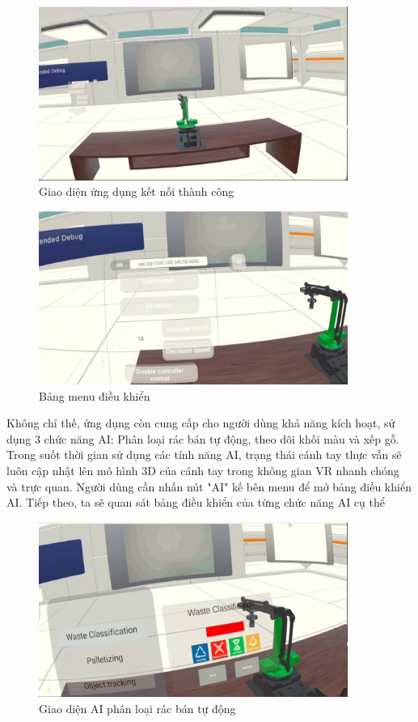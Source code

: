 \begin{figure}[H]
    \centering
    \includegraphics[width=0.9\textwidth]{Images/Result/vr_success.jpg}
    \caption{Giao diện ứng dụng kết nối thành công}
    \label{fig:vr_success}
\end{figure}

\begin{figure}[H]
    \centering
    \includegraphics[width=0.9\textwidth]{Images/Result/vr_menu.jpg}
    \caption{Bảng menu điều khiển}
    \label{fig:vr_menu}
\end{figure}

Không chỉ thế, ứng dụng còn cung cấp cho người dùng khả năng kích hoạt, sử dụng 3 chức năng AI: Phân loại rác bán tự động, theo dõi khối màu và xếp gỗ. Trong suốt thời gian sử dụng các tính năng AI, trạng thái cánh tay thực vẫn sẽ luôn cập nhật lên mô hình 3D của cánh tay trong không gian VR nhanh chóng và trực quan. Người dùng cần nhấn nút "AI" kế bên menu để mở bảng điều khiển AI. Tiếp theo, ta sẽ quan sát bảng điều khiển của từng chức năng AI cụ thể

\begin{figure}[H]
    \centering
    \includegraphics[width=0.9\textwidth]{Images/Result/vr_waste.jpg}
    \caption{Giao diện AI phân loại rác bán tự động}
    \label{fig:vr_waste}
\end{figure}


